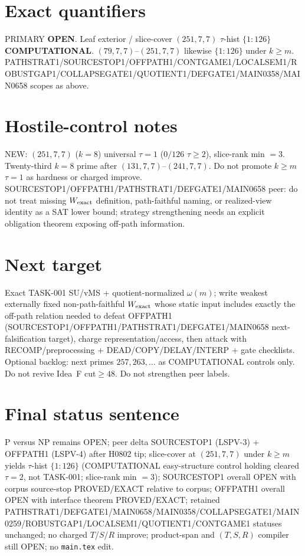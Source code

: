 \documentclass[11pt]{article}
\begin{document}
\section*{Exact quantifiers}
PRIMARY \textbf{OPEN}. Leaf exterior / slice-cover $(251,7,7)$ $\tau$-hist $\{1{:}126\}$ \textbf{COMPUTATIONAL}.
$(79,7,7)$--$(251,7,7)$ likewise $\{1{:}126\}$ under $k{\ge}m$.
PATHSTRAT1/SOURCESTOP1/OFFPATH1/CONTGAME1/LOCALSEM1/ROBUSTGAP1/COLLAPSEGATE1/QUOTIENT1/DEFGATE1/MAIN0358/MAIN0658 scopes as above.

\section*{Hostile-control notes}
NEW: $(251,7,7)$ ($k{=}8$) universal $\tau{=}1$ ($0/126$ $\tau{\ge}2$), slice-rank min $=3$.
Twenty-third $k{=}8$ prime after $(131,7,7)$--$(241,7,7)$.
Do not promote $k{\ge}m$ $\tau{=}1$ as hardness or charged improve.
SOURCESTOP1/OFFPATH1/PATHSTRAT1/DEFGATE1/MAIN0658 peer: do not treat missing $W_{\rm exact}$ definition,
path-faithful naming, or realized-view identity as a SAT lower bound;
strategy strengthening needs an explicit obligation theorem exposing off-path information.

\section*{Next target}
Exact TASK-001 SU/vMS + quotient-normalized $\omega(m)$; write weakest externally fixed non-path-faithful
$W_{\rm exact}$ whose static input includes exactly the off-path relation needed to defeat OFFPATH1
(SOURCESTOP1/OFFPATH1/PATHSTRAT1/DEFGATE1/MAIN0658 next-falsification target), charge representation/access,
then attack with RECOMP/preprocessing + DEAD/COPY/DELAY/INTERP + gate checklists.
Optional backlog: next primes $257,263,\ldots$ as COMPUTATIONAL controls only.
Do not revive Idea~F cut$\ge48$. Do not strengthen peer labels.

\section*{Final status sentence}
P versus NP remains OPEN; peer delta SOURCESTOP1 (LSPV-3) + OFFPATH1 (LSPV-4) after H0802 tip; slice-cover at $(251,7,7)$ under $k{\ge}m$ yields $\tau$-hist $\{1{:}126\}$ (COMPUTATIONAL easy-structure control holding cleared $\tau{=}2$, not TASK-001; slice-rank min $=3$); SOURCESTOP1 overall OPEN with corpus source-stop PROVED/EXACT relative to corpus; OFFPATH1 overall OPEN with interface theorem PROVED/EXACT; retained PATHSTRAT1/DEFGATE1/MAIN0658/MAIN0358/COLLAPSEGATE1/MAIN0259/ROBUSTGAP1/LOCALSEM1/QUOTIENT1/CONTGAME1 statuses unchanged; no charged $T$/$S$/$R$ improve; product-span and $(T,S,R)$ compiler still OPEN; no \texttt{main.tex} edit.
\end{document}

